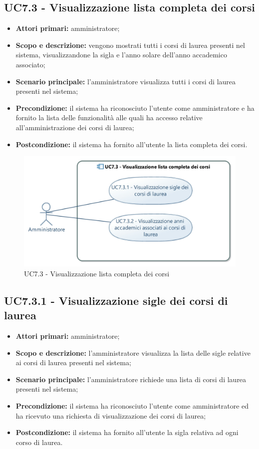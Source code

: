 \documentclass[AnalisiDeiRequisiti.tex]{subfiles}
\begin{document}
\subsection{UC7.3 - Visualizzazione lista completa dei corsi}
\begin{itemize}
	\item \textbf{Attori primari:} amministratore;
	\item \textbf{Scopo e descrizione:} vengono mostrati tutti i corsi di laurea presenti nel sistema, visualizzandone la sigla e l'anno solare dell'anno accademico associato;
	\item \textbf{Scenario principale:} l'amministratore visualizza tutti i corsi di laurea presenti nel sistema;
	\item \textbf{Precondizione:} il sistema ha riconosciuto l'utente come amministratore e ha fornito la lista delle funzionalità alle quali ha accesso relative all'amministrazione dei corsi di laurea; 
	\item \textbf{Postcondizione:} il sistema ha fornito all'utente la lista completa dei corsi.
\end{itemize}
\begin{figure}[H]
	\centering
	\includegraphics[width=0.8\linewidth]{UC7_3.jpg}
	\caption{UC7.3 - Visualizzazione lista completa dei corsi}
	\label{fig:UC7.3 - Visualizzazione lista completa dei corsi}
\end{figure}
\subsection{UC7.3.1 - Visualizzazione sigle dei corsi di laurea}
\begin{itemize}
	\item \textbf{Attori primari:} amministratore;
	\item \textbf{Scopo e descrizione:} l'amministratore visualizza la lista delle sigle relative ai corsi di laurea presenti nel sistema;
	\item \textbf{Scenario principale:} l'amministratore richiede una lista di corsi di laurea presenti nel sistema;
	\item \textbf{Precondizione:} il sistema ha riconosciuto l'utente come amministratore ed ha ricevuto una richiesta di visualizzazione dei corsi di laurea; 
	\item \textbf{Postcondizione:} il sistema ha fornito all'utente la sigla relativa ad ogni corso di laurea.
\end{itemize}
\end{document}

